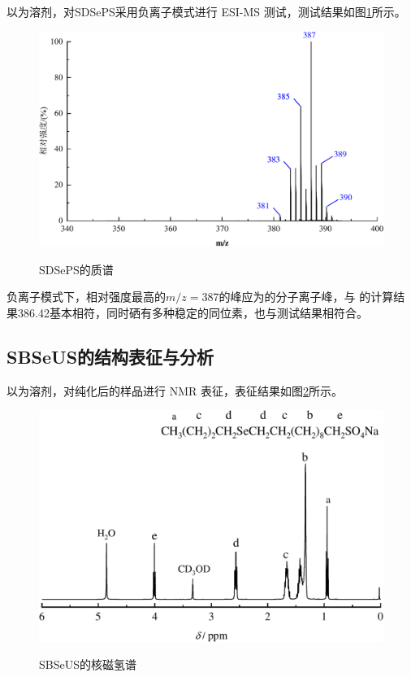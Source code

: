 \documentclass[bachelor,winfonts,replaceperiod]{jnuthesis}
\begin{document}
    以为溶剂，对SDSePS采用负离子模式进行 ESI-MS 测试，测试结果如图\ref{fig:SDSePS-mass}所示。
     \begin{figure}[htbp]
        \centering
        \includegraphics[width=.8\textwidth]{figure/SDSePS-mass.pdf}\\
        \caption{SDSePS的质谱}\label{fig:SDSePS-mass}
    \end{figure}
    
    负离子模式下，相对强度最高的$m/z = 387$的峰应为的分子离子峰，与
    的计算结果386.42基本相符，同时硒有多种稳定的同位素，也与测试结果相符合。
    
    \subsection{SBSeUS的结构表征与分析}
        以为溶剂，对纯化后的样品进行     NMR 表征，表征结果如图\ref{fig:SBSeUS-nmr}所示。
    \begin{figure}[htbp]
        \centering
        \includegraphics[width=.75\textwidth]{figure/SBSeUS-nmr.pdf}\\
        \caption{SBSeUS的核磁氢谱}\label{fig:SBSeUS-nmr}
    \end{figure}
    
\end{document}
